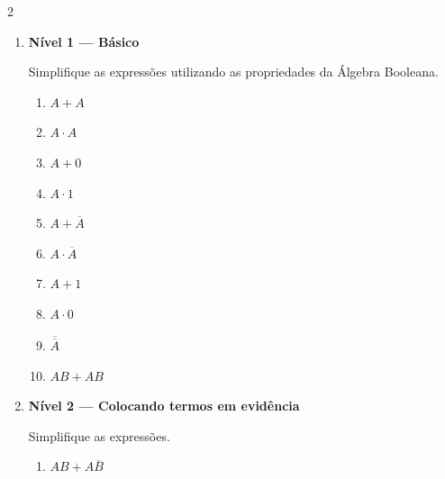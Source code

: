 \documentclass[a4paper,12pt]{article}
\begin{document}
\begin{multicols}{2}
\raggedcolumns

\vspace{0.7cm}

\begin{enumerate}[leftmargin=*]


\item \textbf{Nível 1 — Básico}

Simplifique as expressões utilizando as propriedades da Álgebra Booleana.

\begin{enumerate}[label=(\Alph*)]

    \item $A + A$

    \item $A \cdot A$

    \item $A + 0$

    \item $A \cdot 1$

    \item $A + \overline{A}$

    \item $A \cdot \overline{A}$

    \item $A + 1$

    \item $A \cdot 0$

    \item $\overline{\overline{A}}$

    \item $AB + AB$

\end{enumerate}

\vspace{0.4cm}


\item \textbf{Nível 2 — Colocando termos em evidência}

Simplifique as expressões.

\begin{enumerate}[label=(\Alph*)]

    \item $AB + A\overline{B}$


\end{enumerate}
\end{enumerate}
\end{multicols}
\end{document}
